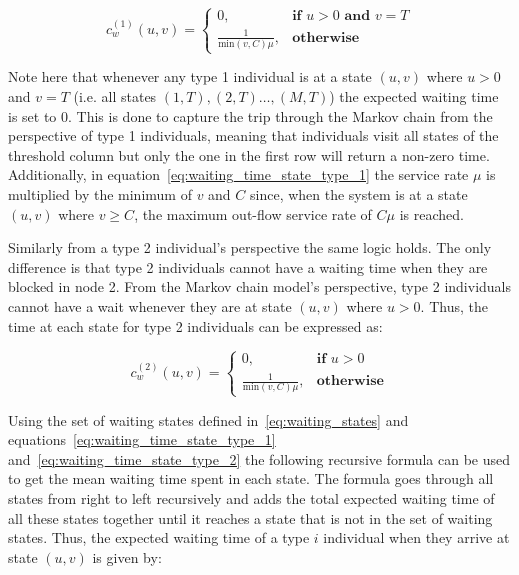 \begin{equation}\label{eq:waiting_time_state_type_1}
    c^{(1)}_w(u,v) =
    \begin{cases}
        0, & \textbf{if } u > 0 \textbf{ and } v = T \\
        \frac{1}{\text{min}(v,C)\mu}, & \textbf{otherwise}
    \end{cases}
\end{equation}

Note here that whenever any type 1 individual is at a state \((u,v)\) where
\(u > 0\) and \(v = T\) (i.e. all states \((1,T), (2,T) \dots, (M,T)\)) the
expected waiting time is set to \(0\).
This is done to capture the trip through the Markov chain from the perspective
of type 1 individuals,
meaning that individuals visit all states of the threshold column but only the
one in the first row will return a non-zero time.
Additionally, in equation~\eqref{eq:waiting_time_state_type_1} the service rate
\(\mu\) is multiplied by the minimum of \(v\) and \(C\) since, when the system
is at a state \((u,v)\) where \(v \geq C\), the maximum out-flow service rate
of \( C \mu \) is reached.


Similarly from a type 2 individual's perspective the same logic holds.
The only difference is that type 2 individuals cannot have a waiting time when
they are blocked in node 2.
From the Markov chain model's perspective, type 2 individuals cannot have a wait
whenever they are at state \((u, v)\) where \(u > 0\).
Thus, the time at each state for type 2 individuals can be expressed as:

\begin{equation}\label{eq:waiting_time_state_type_2}
    c^{(2)}_w(u,v) =
    \begin{cases}
        0, & \textbf{if } u > 0 \\
        \frac{1}{\text{min}(v, C)\mu}, & \textbf{otherwise}
    \end{cases}
\end{equation}


Using the set of waiting states defined in~\eqref{eq:waiting_states} and
equations~\eqref{eq:waiting_time_state_type_1}
and~\eqref{eq:waiting_time_state_type_2} the following recursive formula can be
used to get the mean waiting time spent in each state.
The formula goes through all states from right to left recursively and adds the
total expected waiting time of all these states together until it reaches a
state that is not in the set of waiting states.
Thus, the expected waiting time of a type \(i\) individual when they arrive at
state \( (u,v) \) is given by:

